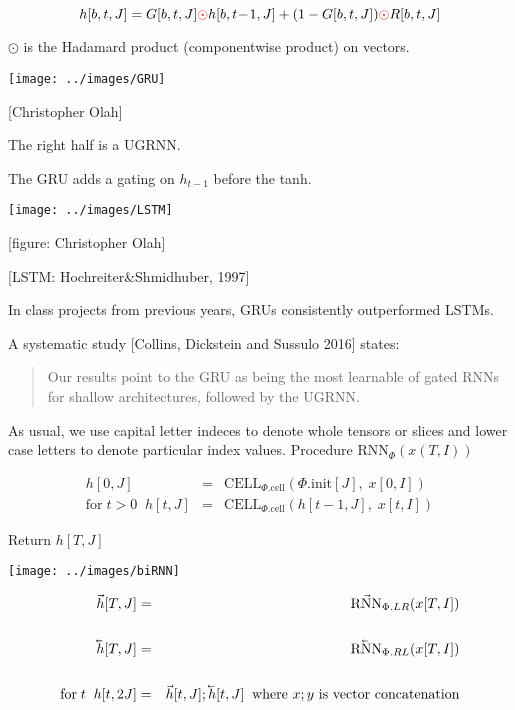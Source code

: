 {$$h[b,t,J] =  G[b,t,J]{\color{red} \odot} h[b,t\!-\!1,J] + (1-G[b,t,J]){\color{red} \odot} R[b,t,J]$$

\vfill
$\odot$ is the Hadamard product (componentwise product) on vectors.


\centerline{\texttt{[image: ../images/GRU]}}
\centerline{{\huge [Christopher Olah]}}

\vfill
The right half is a UGRNN.

\vfill
The GRU adds a gating on $h_{t-1}$ before the tanh.

\centerline{\texttt{[image: ../images/LSTM]}}
\centerline{{\large [figure: Christopher Olah]}}

\centerline{\Large [LSTM: Hochreiter\&Shmidhuber, 1997]}


\vfill
In class projects from previous years, GRUs consistently outperformed LSTMs.

\vfill
A systematic study [Collins, Dickstein and Sussulo 2016] states:

\begin{quotation}
  Our results point to the GRU as being the most learnable of gated RNNs for shallow architectures, followed by the UGRNN.
\end{quotation}

As usual, we use capital letter indeces to denote whole tensors or slices and lower case letters to denote particular index values.
\vfill
Procedure $\mathrm{RNN}_\Phi(x(T,I))$

\begin{eqnarray*}
h[0,J] &  = &  \mathrm{CELL}_{\Phi.\mathrm{cell}}(\Phi.\mathrm{init}[J],\;x[0,I]) \\
\mathrm{for}\;t>0\;\;h[t,J] &  =  & \mathrm{CELL}_{\Phi.\mathrm{cell}}(h[t-1,J],\;x[t,I])
\end{eqnarray*}

\vfill
Return $h[T,J]$




\centerline{\texttt{[image: ../images/biRNN]}}

\begin{eqnarray*}
\vec{h}[T,J] & = & \vec{\mathrm{RNN}}_{\Phi.LR}(x[T,I]) \\
\\
\cev{h}[T,J] & = & \cev{\mathrm{RNN}}_{\Phi.RL}(x[T,I]) \\
\\
\mbox{for}\;t\;\;h[t,2J] & = & \vec{h}[t,J];\cev{h}[t,J]\;\;\mbox{where $x;y$ is vector concatenation}
\end{eqnarray*}

}

